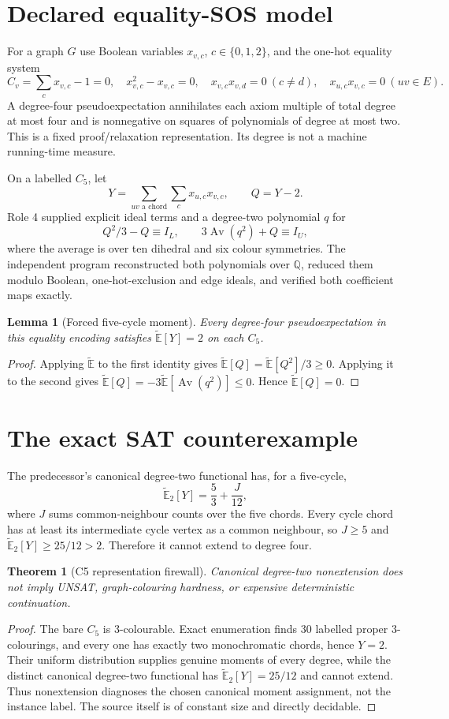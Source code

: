 \documentclass[11pt]{article}
\newtheorem{theorem}{Theorem}
\newtheorem{lemma}{Lemma}
\newcommand{\E}{\widetilde{\mathbb E}}
\begin{document}
\section{Declared equality-SOS model}
For a graph $G$ use Boolean variables $x_{v,c}$, $c\in\{0,1,2\}$, and the
one-hot equality system
\[
C_v=\sum_cx_{v,c}-1=0,\quad x_{v,c}^2-x_{v,c}=0,\quad
x_{v,c}x_{v,d}=0\ (c\ne d),\quad x_{u,c}x_{v,c}=0\ (uv\in E).
\]
A degree-four pseudoexpectation annihilates each axiom multiple of total
degree at most four and is nonnegative on squares of polynomials of degree at
most two.  This is a fixed proof/relaxation representation.  Its degree is
not a machine running-time measure.

On a labelled $C_5$, let
\[
Y=\sum_{uv\text{ a chord}}\sum_c x_{u,c}x_{v,c},\qquad Q=Y-2.
\]
Role 4 supplied explicit ideal terms and a degree-two polynomial $q$ for
\[
Q^2/3-Q\equiv I_L,\qquad 3\operatorname{Av}(q^2)+Q\equiv I_U,
\]
where the average is over ten dihedral and six colour symmetries.  The
independent program reconstructed both polynomials over $\mathbb Q$, reduced
them modulo Boolean, one-hot-exclusion and edge ideals, and verified both
coefficient maps exactly.

\begin{lemma}[Forced five-cycle moment]
Every degree-four pseudoexpectation in this equality encoding satisfies
$\E[Y]=2$ on each $C_5$.
\end{lemma}
\begin{proof}
Applying $\E$ to the first identity gives
$\E[Q]=\E[Q^2]/3\ge0$.  Applying it to the second gives
$\E[Q]=-3\E[\operatorname{Av}(q^2)]\le0$.  Hence $\E[Q]=0$.
\end{proof}

\section{The exact SAT counterexample}
The predecessor's canonical degree-two functional has, for a five-cycle,
\[
\E_2[Y]=\frac53+\frac{J}{12},
\]
where $J$ sums common-neighbour counts over the five chords.  Every cycle
chord has at least its intermediate cycle vertex as a common neighbour, so
$J\ge5$ and $\E_2[Y]\ge25/12>2$.  Therefore it cannot extend to degree four.

\begin{theorem}[C5 representation firewall]
Canonical degree-two nonextension does not imply UNSAT, graph-colouring
hardness, or expensive deterministic continuation.
\end{theorem}
\begin{proof}
The bare $C_5$ is 3-colourable.  Exact enumeration finds 30 labelled proper
3-colourings, and every one has exactly two monochromatic chords, hence
$Y=2$.  Their uniform distribution supplies genuine moments of every degree,
while the distinct canonical degree-two functional has $\E_2[Y]=25/12$ and
cannot extend.  Thus nonextension diagnoses the chosen canonical moment
assignment, not the instance label.  The source itself is of constant size
and directly decidable.
\end{proof}
\end{document}
